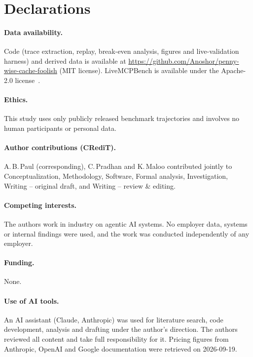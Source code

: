 \documentclass[11pt]{article}
\begin{document}
\section*{Declarations}
\paragraph{Data availability.} Code (trace extraction, replay, break-even analysis, figures and live-validation harness) and derived data is available at \url{https://github.com/Anoshor/penny-wise-cache-foolish} (MIT license). LiveMCPBench is available under the Apache-2.0 license~\cite{livemcpbench}.
\paragraph{Ethics.} This study uses only publicly released benchmark trajectories and involves no human participants or personal data.
\paragraph{Author contributions (CRediT).} A.\,B.\,Paul (corresponding), C.\,Pradhan and K.\,Maloo contributed jointly to Conceptualization, Methodology, Software, Formal analysis, Investigation, Writing -- original draft, and Writing -- review \& editing.
\paragraph{Competing interests.} The authors work in industry on agentic AI systems. No employer data, systems or internal findings were used, and the work was conducted independently of any employer.
\paragraph{Funding.} None.
\paragraph{Use of AI tools.} An AI assistant (Claude, Anthropic) was used for literature search, code development, analysis and drafting under the author's direction. The authors reviewed all content and take full responsibility for it. Pricing figures from Anthropic, OpenAI and Google documentation were retrieved on 2026-09-19.
\end{document}
